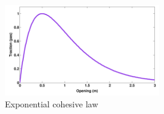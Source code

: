 \begin{figure}[!htb]
  \begin{center}
    \includegraphics[width=0.6\textwidth,keepaspectratio=true]{figures/cohesive_exponential.pdf}
    \caption{Exponential cohesive law}
    \label{fig:smm:CL:ECL}
  \end{center}
\end{figure}


